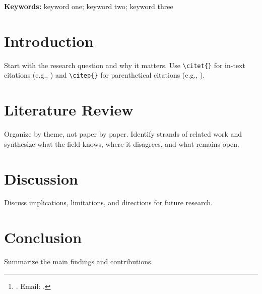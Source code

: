\documentclass[12pt]{article}
\title{\papertitle}
\author{\paperauthor\thanks{\paperaffiliation. Email: \href{mailto:\paperemail}{\paperemail}.}}
\date{\today}
\begin{document}
\maketitle

\begin{abstract}
Replace this with your abstract.
\end{abstract}

\bigskip
\noindent \textbf{Keywords:} keyword one; keyword two; keyword three

\newpage

\section{Introduction}
\label{sec:intro}

Start with the research question and why it matters. Use \verb|\citet{}| for in-text citations (e.g., \citet{fama1993common}) and \verb|\citep{}| for parenthetical citations (e.g., \citep{petersen2009estimating}).

\section{Literature Review}
\label{sec:literature}

Organize by theme, not paper by paper. Identify strands of related work and synthesize what the field knows, where it disagrees, and what remains open.

\section{Discussion}
\label{sec:discussion}

Discuss implications, limitations, and directions for future research.

\section{Conclusion}
\label{sec:conclusion}

Summarize the main findings and contributions.




%
\end{document}
